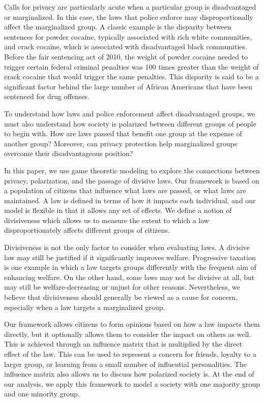 Calls for privacy are particularly acute when a particular group is disadvantaged or marginalized.  In this case, the laws that police enforce may disproportionally affect the marginalized group.  A classic example is the disparity between sentences for powder cocaine, typically associated with rich white communities, and crack cocaine, which is associated with disadvantaged black communities.  Before the fair sentencing act of 2010, the weight of powder cocaine needed to trigger certain federal criminal penalties was 100 times greater than the weight of crack cocaine that would trigger the same penalties.  This disparity is said to be a significant factor behind the large number of African Americans that have been sentenced for drug offenses.~\cite{beaver2009getting}

To understand how laws and police enforcement affect disadvantaged groups, we must also understand how society is polarized between different groups of people to begin with.  How are laws passed that benefit one group at the expense of another group?  Moreover, can privacy protection help marginalized groups overcome their disadvantageous position?

In this paper, we use game theoretic modeling to explore the connections between privacy, polarization, and the passage of divisive laws.  Our framework is based on a population of citizens that influence what laws are passed, or what laws are maintained.  A law is defined in terms of how it impacts each individual, and our model is flexible in that it allows any set of effects.  We define a notion of divisiveness which allows us to measure the extent to which a law disproportionately affects different groups of citizens.

Divisiveness is not the only factor to consider when evaluating laws.  A divisive law may still be justified if it significantly improves welfare.  Progressive taxation is one example in which a law targets groups differently with the frequent aim of enhancing welfare.  On the other hand, some laws may not be divisive at all, but may still be welfare-decreasing or unjust for other reasons.  Nevertheless, we believe that divisiveness should generally be viewed as a cause for concern, especially when a law targets a marginalized group.

Our framework allows citizens to form opinions based on how a law impacts them directly, but it optionally allows them to consider the impact on others as well.  This is achieved through an influence matrix that is multiplied by the direct effect of the law.  This can be used to represent a concern for friends, loyalty to a larger group, or learning from a small number of influential personalities.  The influence matrix also allows us to discuss how polarized society is.  At the end of our analysis, we apply this framework to model a society with one majority group and one minority group.


